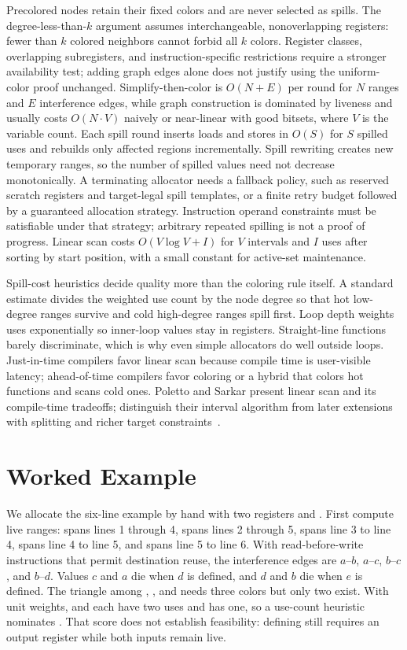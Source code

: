 Precolored nodes retain their fixed colors and are never selected as spills.
The degree-less-than-$k$ argument assumes interchangeable, nonoverlapping registers: fewer than $k$ colored neighbors cannot forbid all $k$ colors.
Register classes, overlapping subregisters, and instruction-specific restrictions require a stronger availability test; adding graph edges alone does not justify using the uniform-color proof unchanged.
Simplify-then-color is $O(N + E)$ per round for $N$ ranges and $E$ interference edges, while graph construction is dominated by liveness and usually costs $O(N \cdot V)$ naively or near-linear with good bitsets, where $V$ is the variable count.
Each spill round inserts loads and stores in $O(S)$ for $S$ spilled uses and rebuilds only affected regions incrementally.
Spill rewriting creates new temporary ranges, so the number of spilled values need not decrease monotonically.
A terminating allocator needs a fallback policy, such as reserved scratch registers and target-legal spill templates, or a finite retry budget followed by a guaranteed allocation strategy.
Instruction operand constraints must be satisfiable under that strategy; arbitrary repeated spilling is not a proof of progress.
Linear scan costs $O(V \log V + I)$ for $V$ intervals and $I$ uses after sorting by start position, with a small constant for active-set maintenance.

Spill-cost heuristics decide quality more than the coloring rule itself.
A standard estimate divides the weighted use count by the node degree so that hot low-degree ranges survive and cold high-degree ranges spill first.
Loop depth weights uses exponentially so inner-loop values stay in registers.
Straight-line functions barely discriminate, which is why even simple allocators do well outside loops.
Just-in-time compilers favor linear scan because compile time is user-visible latency; ahead-of-time compilers favor coloring or a hybrid that colors hot functions and scans cold ones.
Poletto and Sarkar present linear scan and its compile-time tradeoffs; distinguish their interval algorithm from later extensions with splitting and richer target constraints~\cite{poletto-1999-linear-scan}.

\section{Worked Example}\label{sec:ch27-worked}

We allocate the six-line example by hand with two registers  and .
First compute live ranges:  spans lines 1 through 4,  spans lines 2 through 5,  spans line 3 to line 4,  spans line 4 to line 5, and  spans line 5 to line 6.
With read-before-write instructions that permit destination reuse, the interference edges are $a$--$b$, $a$--$c$, $b$--$c$, and $b$--$d$.
Values $c$ and $a$ die when $d$ is defined, and $d$ and $b$ die when $e$ is defined.
The triangle among , , and  needs three colors but only two exist.
With unit weights,  and  each have two uses and  has one, so a use-count heuristic nominates .
That score does not establish feasibility: defining  still requires an output register while both inputs remain live.

